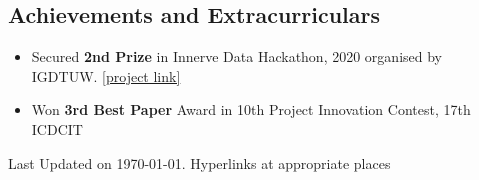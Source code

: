 \documentclass[11pt,a4paper,calibri]{moderncv}        %
\begin{document}
	\vspace{-7pt}
	\subsection{Achievements and Extracurriculars}
	
	\begin{itemize}
		\item Secured \textbf{2nd Prize} in Innerve Data Hackathon, 2020 organised by IGDTUW. \href{https://gitlab.com/innerve/sperm-motility-analysis}{ [project link]}
		\vspace{-4pt}
		\item Won \textbf{3rd Best Paper} Award in 10th Project Innovation Contest, 17th ICDCIT
		\vspace{-4pt}
		\vspace{-4pt}
	\end{itemize}
	
	
%	
	
	
	\vfill
	\textnormal{\footnotesize Last Updated on \today. Hyperlinks at appropriate places}
	
%	
	
	
	
\end{document}
